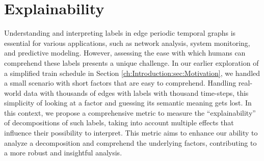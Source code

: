 \chapter{Explainability}
\label{ch:explainability}
Understanding and interpreting labels in edge periodic temporal graphs is essential for various applications, such as network analysis, system monitoring, and predictive modeling.
However, assessing the ease with which humans can comprehend these labels presents a unique challenge.
In our earlier exploration of a simplified train schedule in Section \ref{ch:Introduction:sec:Motivation}, we handled a small scenario with short factors that are easy to comprehend.
Handling real-world data with thousands of edges with labels with thousand time-steps, this simplicity of looking at a factor and guessing its semantic meaning gets lost.
In this context, we propose a comprehensive metric to measure the \enquote{explainability} of decompositions of such labels, taking into account multiple effects that influence their possibility to interpret.
This metric aims to enhance our ability to analyze a decomposition and comprehend the underlying factors, contributing to a more robust and insightful analysis.

